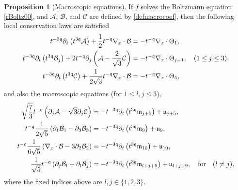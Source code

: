 \documentclass[reqno]{amsart}
\newcommand{\qq}{\mathfrak{q}}
\newcommand{\tmq}{t^{-\qq}}
\newcommand{\tTq}{t^{3\qq}}
\newcommand{\tmTq}{t^{-3\qq}}
\newcommand{\highG}{\Theta}
\theoremstyle{definition}
\newtheorem{proposition}[theorem]{Proposition}
\numberwithin{equation}{section}
\numberwithin{theorem}{section}
\begin{document}
\begin{proposition}[Macroscopic equations]\label{macroscopic.prop}
If \(f\) solves the Boltzmann equation \eqref{rBoltz00}, and \(\mathcal{A}\), \(\mathcal{B}\), and \(\mathcal{C}\) are defined by \eqref{defmacrocoef}, then the following local conservation laws are satisfied
\begin{align} \label{local.cons}
    \tmTq\partial_t \left(\tTq \mathcal{A} \right)
     +
\frac{1}{2}  \tmq \nabla_x \cdot \mathcal{B}
&=-\tmq \nabla_x \cdot \highG_{1},
\\ \notag
 \tmTq\partial_t \left(\tTq \mathcal{B}_{j} \right) 
 +
2\tmq\partial_j \left( \mathcal{A}
-\frac{2}{\sqrt{3}}
\mathcal{C}  \right)
&=-\tmq \nabla_x \cdot \highG_{j+1}, \quad  (1 \leq j \leq 3),
\\ \notag
\tmTq\partial_t \left(\tTq \mathcal{C} \right) 
  +
\frac{1}{2\sqrt{3}}  \tmq \nabla_x \cdot \mathcal{B} 
&=-\tmq \nabla_x \cdot \highG_{5},
\end{align}
and also the macroscopic equations (for $1 \leq l, j \leq 3$),
\begin{align} \notag
\sqrt{\frac{7}{3}}\tmq\left(\partial_j\mathcal{A}
-
\sqrt{3}\partial_j\mathcal{C} \right)
&=-\tmTq  \partial_t\left( \tTq \mathfrak{m}_{j+5} \right)+\mathfrak{u}_{j+5}, 
\\  \label{macroscopic}
\tmq\frac{1}{2\sqrt{5}} \left( \partial_1 \mathcal{B}_1 - \partial_3 \mathcal{B}_3\right)
&=-\tmTq  \partial_t\left( \tTq \mathfrak{m}_{9} \right)+\mathfrak{u}_{9},
 \\ \notag
\tmq\frac{1}{6\sqrt{5}}\left( \nabla_x\cdot \mathcal{B}-3\partial_2 \mathcal{B}_2\right)
&=-\tmTq  \partial_t\left( \tTq \mathfrak{m}_{10} \right)+\mathfrak{u}_{10},
 \\ \notag
\frac{1}{\sqrt{5}}  \tmq\left(\partial_j \mathcal{B}_{l}+\partial_l \mathcal{B}_{j} \right)
&=-\tmTq  \partial_t\left( \tTq \mathfrak{m}_{l+j+9} \right)+\mathfrak{u}_{l+j+9},\quad \text{for}
\quad (l\neq j),
\end{align}
where the fixed indices above are $l,j\in\{1,2,3\}$. 
\end{proposition}
\end{document}
